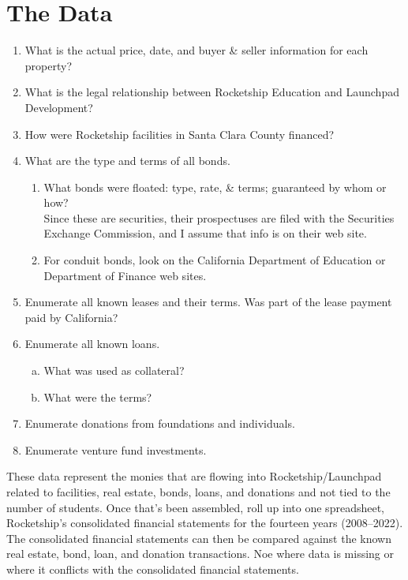 \section{The Data}
\begin{enumerate}
  \item What is the actual price, date, and buyer \& seller information for each property?
  \item What is the legal relationship between Rocketship Education and Launchpad Development?
  \item How were Rocketship facilities in Santa Clara County financed?
  \item What are the type and terms of all bonds.
  \begin{enumerate}
    \item What bonds were floated: type, rate, \& terms; guaranteed by whom or how? \\
    \noindent Since these are securities, their prospectuses are filed with the Securities Exchange Commission, and I assume that info is on their web site.
    \item For conduit bonds, look on the California Department of Education or Department of Finance web sites.
  \end{enumerate}
  \item Enumerate all known leases and their terms. Was part of the lease payment paid by California?
  \item Enumerate all known loans.
  \begin{enumerate}[a.]
    \item What was used as collateral? 
    \item What were the terms?
  \end{enumerate}    
  \item Enumerate donations from foundations and individuals.
  \item Enumerate venture fund investments.
\end{enumerate}

These data represent the monies that are flowing into Rocketship/Launchpad related to facilities, real estate, bonds, loans, and donations and not tied to the number of students. Once that's been assembled, roll up into one spreadsheet, Rocketship's consolidated financial statements for the fourteen years (2008--2022). The consolidated financial statements can then be compared against the known real estate, bond, loan, and donation transactions. Noe where data is missing or where it conflicts with the consolidated financial statements.

